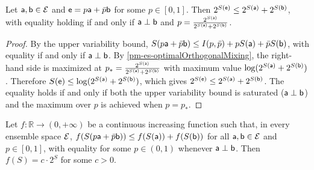 \begin{mathSection}
	\begin{prop}\label{pm-es-exponentialEntropySubadditivity}
		Let $\ens[a], \ens[b] \in \Ens$ and $\ens = p\ens[a] + \bar{p}\ens[b]$ for some $p \in [0,1]$. Then $2^{S(\ens)} \leq 2^{S(\ens[a])} + 2^{S(\ens[b])}$, with equality holding if and only if $\ens[a] \ortho \ens[b]$ and $p = \frac{2^{S(\ens[a])}}{2^{S(\ens[a])}+2^{S(\ens[b])}}$.
	\end{prop}
	
	\begin{proof}
		By the upper variability bound, $S(p\ens[a]+\bar{p}\ens[b]) \leq I(p,\bar{p}) + pS(\ens[a]) + \bar{p}S(\ens[b])$, with equality if and only if $\ens[a] \ortho \ens[b]$. By \ref{pm-es-optimalOrthogonalMixing}, the right-hand side is maximized at $p_* = \frac{2^{S(\ens[a])}}{2^{S(\ens[a])}+2^{S(\ens[b])}}$ with maximum value $\log(2^{S(\ens[a])}+2^{S(\ens[b])})$. Therefore $S(\ens) \leq \log(2^{S(\ens[a])}+2^{S(\ens[b])})$, which gives $2^{S(\ens)} \leq 2^{S(\ens[a])}+2^{S(\ens[b])}$. The equality holds if and only if both the upper variability bound is saturated ($\ens[a] \ortho \ens[b]$) and the maximum over $p$ is achieved when $p = p_*$.
	\end{proof}
	
	\begin{prop}\label{pm-es-uniquenessExponentialEntropy}
		Let $f : \mathbb{R} \to (0,+\infty)$ be a continuous increasing function such that, in every ensemble space $\Ens$,  $f(S(p\ens[a]+\bar{p}\ens[b])) \leq f(S(\ens[a]))+f(S(\ens[b]))$ for all $\ens[a],\ens[b]\in\Ens$ and $p\in[0,1]$, with equality for some $p \in (0,1)$ whenever $\ens[a]\ortho\ens[b]$. Then $f(S)=c \cdot 2^S$ for some $c>0$.
	\end{prop}
	

\end{mathSection}
